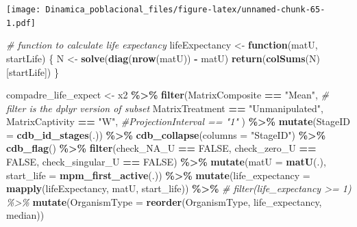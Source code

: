 \documentclass[
]{book}
\newenvironment{Shaded}{\begin{snugshade}}{\end{snugshade}}
\newcommand{\AttributeTok}[1]{\textcolor[rgb]{0.13,0.29,0.53}{#1}}
\newcommand{\CommentTok}[1]{\textcolor[rgb]{0.56,0.35,0.01}{\textit{#1}}}
\newcommand{\ConstantTok}[1]{\textcolor[rgb]{0.56,0.35,0.01}{#1}}
\newcommand{\ControlFlowTok}[1]{\textcolor[rgb]{0.13,0.29,0.53}{\textbf{#1}}}
\newcommand{\FunctionTok}[1]{\textcolor[rgb]{0.13,0.29,0.53}{\textbf{#1}}}
\newcommand{\NormalTok}[1]{#1}
\newcommand{\OtherTok}[1]{\textcolor[rgb]{0.56,0.35,0.01}{#1}}
\newcommand{\SpecialCharTok}[1]{\textcolor[rgb]{0.81,0.36,0.00}{\textbf{#1}}}
\newcommand{\StringTok}[1]{\textcolor[rgb]{0.31,0.60,0.02}{#1}}
\theoremstyle{definition}
\theoremstyle{definition}
\theoremstyle{definition}
\theoremstyle{definition}
\theoremstyle{remark}
\begin{document}
\texttt{[image: Dinamica\_poblacional\_files/figure-latex/unnamed-chunk-65-1.pdf]}

\begin{Shaded}
\begin{Highlighting}[]
\CommentTok{\# function to calculate life expectancy}
\NormalTok{lifeExpectancy }\OtherTok{\textless{}{-}} \ControlFlowTok{function}\NormalTok{(matU, startLife) \{}
\NormalTok{  N }\OtherTok{\textless{}{-}} \FunctionTok{solve}\NormalTok{(}\FunctionTok{diag}\NormalTok{(}\FunctionTok{nrow}\NormalTok{(matU)) }\SpecialCharTok{{-}}\NormalTok{ matU)}
  \FunctionTok{return}\NormalTok{(}\FunctionTok{colSums}\NormalTok{(N)[startLife])}
\NormalTok{\}}

\NormalTok{compadre\_life\_expect }\OtherTok{\textless{}{-}}\NormalTok{ x2 }\SpecialCharTok{\%\textgreater{}\%}
  \FunctionTok{filter}\NormalTok{(MatrixComposite }\SpecialCharTok{==} \StringTok{"Mean"}\NormalTok{, }\CommentTok{\# filter is the dplyr version of subset}
\NormalTok{         MatrixTreatment }\SpecialCharTok{==} \StringTok{"Unmanipulated"}\NormalTok{,}
\NormalTok{         MatrixCaptivity }\SpecialCharTok{==} \StringTok{"W"}\NormalTok{,}
         \CommentTok{\#ProjectionInterval == "1"}
\NormalTok{         ) }\SpecialCharTok{\%\textgreater{}\%} 
  \FunctionTok{mutate}\NormalTok{(}\AttributeTok{StageID =} \FunctionTok{cdb\_id\_stages}\NormalTok{(.)) }\SpecialCharTok{\%\textgreater{}\%}
  \FunctionTok{cdb\_collapse}\NormalTok{(}\AttributeTok{columns =} \StringTok{"StageID"}\NormalTok{) }\SpecialCharTok{\%\textgreater{}\%}
  \FunctionTok{cdb\_flag}\NormalTok{() }\SpecialCharTok{\%\textgreater{}\%} 
  \FunctionTok{filter}\NormalTok{(check\_NA\_U }\SpecialCharTok{==} \ConstantTok{FALSE}\NormalTok{,}
\NormalTok{         check\_zero\_U }\SpecialCharTok{==} \ConstantTok{FALSE}\NormalTok{,}
\NormalTok{         check\_singular\_U }\SpecialCharTok{==} \ConstantTok{FALSE}\NormalTok{) }\SpecialCharTok{\%\textgreater{}\%} 
  \FunctionTok{mutate}\NormalTok{(}\AttributeTok{matU =} \FunctionTok{matU}\NormalTok{(.), }\AttributeTok{start\_life =} \FunctionTok{mpm\_first\_active}\NormalTok{(.)) }\SpecialCharTok{\%\textgreater{}\%} 
  \FunctionTok{mutate}\NormalTok{(}\AttributeTok{life\_expectancy =} \FunctionTok{mapply}\NormalTok{(lifeExpectancy, matU, start\_life)) }\SpecialCharTok{\%\textgreater{}\%} 
 \CommentTok{\# filter(life\_expectancy \textgreater{}= 1) \%\textgreater{}\% }
  \FunctionTok{mutate}\NormalTok{(}\AttributeTok{OrganismType =} \FunctionTok{reorder}\NormalTok{(OrganismType, life\_expectancy, median))}
\end{Highlighting}
\end{Shaded}
\end{document}
